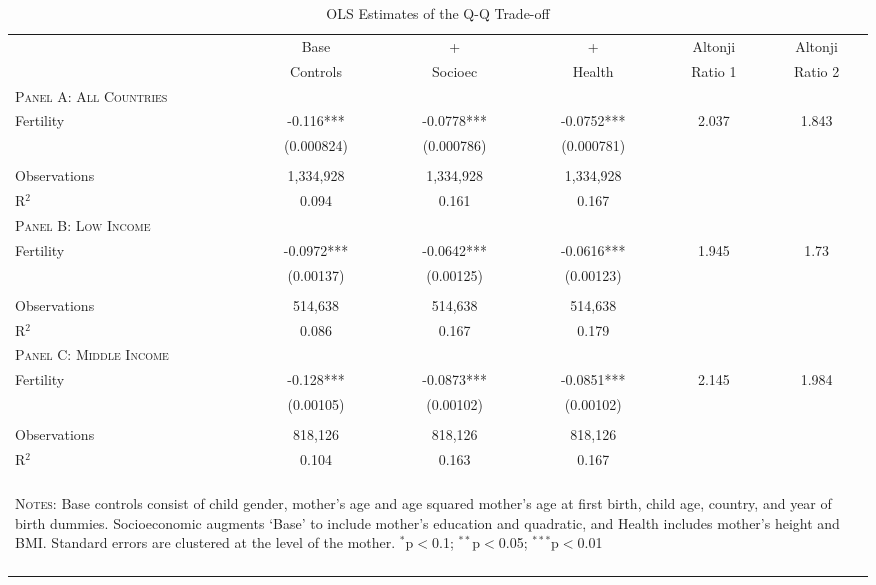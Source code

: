 \begin{table}[!htbp] \centering 
\caption{OLS Estimates of the Q-Q Trade-off} 
 \vspace{4mm}\label{TWINtab:OLS} 
\begin{tabular}{lccccc} \toprule \toprule 
&Base&+&+&Altonji&Altonji\\
&Controls&Socioec&Health&Ratio 1&Ratio 2\\\midrule
\textsc{Panel A: All Countries}&&&&&\\
Fertility &-0.116***&-0.0778***&-0.0752***&2.037&1.843\\
&(0.000824)&(0.000786)&(0.000781)&&\\
&&&&&\\
Observations &1,334,928&1,334,928&1,334,928&&\\
R$^2$&0.094&0.161&0.167&&\\\midrule
\textsc{Panel B: Low Income}&&&&&\\
Fertility &-0.0972***&-0.0642***&-0.0616***&1.945&1.73\\
&(0.00137)&(0.00125)&(0.00123)&&\\
&&&&&\\
Observations &514,638&514,638&514,638&&\\
R$^2$&0.086&0.167&0.179&&\\\midrule
\textsc{Panel C: Middle Income}&&&&&\\
Fertility &-0.128***&-0.0873***&-0.0851***&2.145&1.984\\
&(0.00105)&(0.00102)&(0.00102)&&\\
&&&&&\\
Observations &818,126&818,126&818,126&&\\
R$^2$&0.104&0.163&0.167&&\\\hline\hline\\
\multicolumn{6}{p{14.1cm}}{\begin{footnotesize}\textsc{Notes:} Base controls consist of child gender, mother's age and age squared mother's age at first birth, child age, country, and year of birth dummies.  Socioeconomic augments `Base' to include mother's education and quadratic, and Health includes mother's height and BMI.  Standard errors are clustered at the level of the mother.
$^{*}$p$<$0.1; $^{**}$p$<$0.05; $^{***}$p$<$0.01\end{footnotesize}}  
\\ \bottomrule \normalsize\end{tabular}\end{table} 
